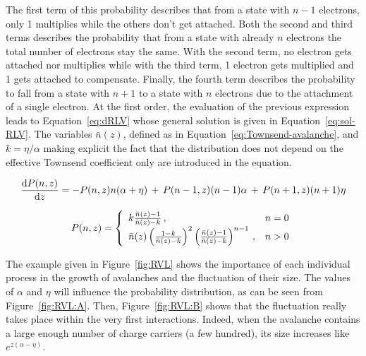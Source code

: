 	The first term of this probability describes that from a state with $n-1$ electrons, only 1 multiplies while the others don't get attached. Both the second and third terms describes the probability that from a state with already $n$ electrons the total number of electrons stay the same. With the second term, no electron gets attached nor multiplies while with the third term, 1 electron gets multiplied and 1 gets attached to compensate. Finally, the fourth term describes the probability to fall from a state with $n+1$ to a state with $n$ electrons due to the attachment of a single electron. At the first order, the evaluation of the previous expression leads to Equation~\ref{eq:dRLV} whose general solution is given in Equation~\ref{eq:sol-RLV}. The variables $\bar{n}(z)$, defined as in Equation~\ref{eq:Townsend-avalanche}, and $k = \eta/\alpha$ making explicit the fact that the distribution does not depend on the effective Townsend coefficient only are introduced in the equation.
	
	\begin{equation}
	\label{eq:dRLV}
	\frac{\mathrm{d}{P(n,z)}}{\mathrm{d}{z}} = -P(n,z)n(\alpha+\eta) \, + \, P(n-1,z)(n-1)\alpha \, + \, P(n+1,z)(n+1)\eta
	\end{equation}
	
	\begin{equation}
	\label{eq:sol-RLV}
	P(n,z) = \left\{
				\begin{array}{l l}
  				k\frac{\bar{n}(z)-1}{\bar{n}(z)-k} \, , & n=0\\
  				\bar{n}(z) \left( \frac{1-k}{\bar{n}(z)-k} \right)^2 \left( \frac{\bar{n}(z)-1}{\bar{n}(z)-k} \right)^{n-1} \, , & n>0\\
  				\end{array} \right.
	\end{equation}
	
	The example given in Figure~\ref{fig:RVL} shows the importance of each individual process in the growth of avalanches and the fluctuation of their size. The values of $\alpha$ and $\eta$ will influence the probability distribution, as can be seen from Figure~\ref{fig:RVL:A}. Then, Figure~\ref{fig:RVL:B} shows that the fluctuation really takes place within the very first interactions. Indeed, when the avalanche contains a large enough number of charge carriers (a few hundred), its size increases like $e^{z(\alpha-\eta)}$.
	
